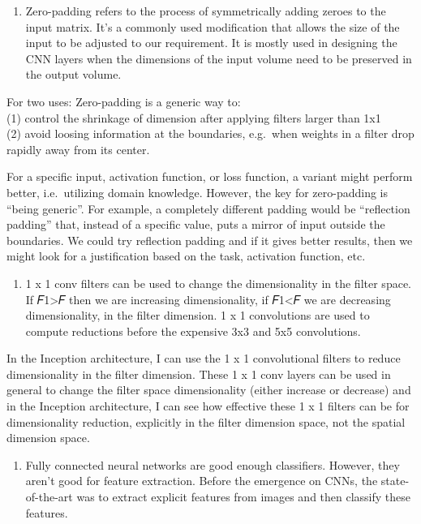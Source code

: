 \documentclass[11pt]{article}
\providecommand{\tightlist}{%
      \setlength{\itemsep}{0pt}\setlength{\parskip}{0pt}}
\begin{document}
    \begin{enumerate}
\def\labelenumi{\arabic{enumi}.}
\setcounter{enumi}{4}
\tightlist
\item
  Zero-padding refers to the process of symmetrically adding zeroes to
  the input matrix. It's a commonly used modification that allows the
  size of the input to be adjusted to our requirement. It is mostly used
  in designing the CNN layers when the dimensions of the input volume
  need to be preserved in the output volume.
\end{enumerate}

For two uses: Zero-padding is a generic way to:\\
(1) control the shrinkage of dimension after applying filters larger
than 1x1\\
(2) avoid loosing information at the boundaries, e.g.~when weights in a
filter drop rapidly away from its center.

For a specific input, activation function, or loss function, a variant
might perform better, i.e.~utilizing domain knowledge. However, the key
for zero-padding is ``being generic''. For example, a completely
different padding would be ``reflection padding'' that, instead of a
specific value, puts a mirror of input outside the boundaries. We could
try reflection padding and if it gives better results, then we might
look for a justification based on the task, activation function, etc.

    \begin{enumerate}
\def\labelenumi{\arabic{enumi}.}
\setcounter{enumi}{5}
\tightlist
\item
  1 x 1 conv filters can be used to change the dimensionality in the
  filter space. If 𝐹1\textgreater{}𝐹 then we are increasing
  dimensionality, if 𝐹1\textless{}𝐹 we are decreasing dimensionality, in
  the filter dimension. 1 x 1 convolutions are used to compute
  reductions before the expensive 3x3 and 5x5 convolutions.
\end{enumerate}

In the Inception architecture, I can use the 1 x 1 convolutional filters
to reduce dimensionality in the filter dimension. These 1 x 1 conv
layers can be used in general to change the filter space dimensionality
(either increase or decrease) and in the Inception architecture, I can
see how effective these 1 x 1 filters can be for dimensionality
reduction, explicitly in the filter dimension space, not the spatial
dimension space.

    \begin{enumerate}
\def\labelenumi{\arabic{enumi}.}
\setcounter{enumi}{6}
\tightlist
\item
  Fully connected neural networks are good enough classifiers. However,
  they aren't good for feature extraction. Before the emergence on CNNs,
  the state-of-the-art was to extract explicit features from images and
  then classify these features.
\end{enumerate}
\end{document}
